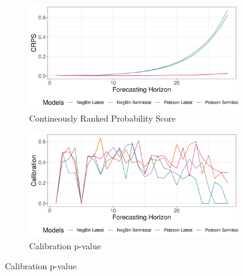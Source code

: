 \begin{figure}[H]
\begin{subfigure}{0.5\textwidth}
  \centering
  \includegraphics[width=\linewidth]{../output/Tchomia_crps.png}  
  \caption{Contineously Ranked Probability Score}
  \label{fig:sub-first}
\end{subfigure}
\begin{subfigure}{0.5\textwidth}
  \centering
  \includegraphics[width=\linewidth]{../output/Tchomia_calibration.png}  
  \caption{Calibration p-value}
  \label{fig:sub-second}
\end{subfigure}


\end{figure}
